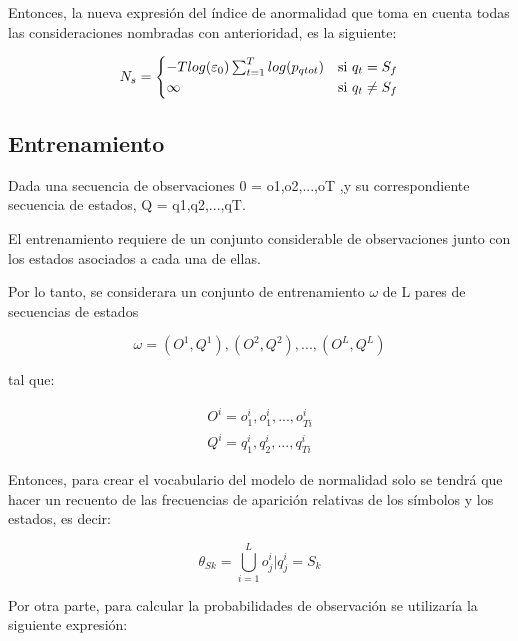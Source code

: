 Entonces, la nueva expresión del índice de anormalidad que toma en cuenta todas las consideraciones nombradas con anterioridad, es la siguiente:

\begin{equation}\label{eq:Ns}
N_{s} = 
	\begin{cases} 
      -Tlog(\varepsilon_{0})\sum_{t=1}^{T}log(p_{qtot}) & $si $  q_{t} = S_{f} \\
      \infty & $si $  q_{t} \neq S_{f} \\ 
   \end{cases}
\end{equation}

\subsection*{Entrenamiento}

Dada una secuencia de observaciones 0 = o1,o2,...,oT ,y  su correspondiente secuencia de estados, Q = q1,q2,...,qT.

El entrenamiento requiere de un conjunto considerable de observaciones  junto con los estados asociados a cada una de ellas.

Por lo tanto, se considerara un conjunto de entrenamiento $\omega$ de L pares de secuencias de estados

\begin{equation}
\omega = {(O^{1},Q^{1}),(O^{2},Q^{2}),...,(O^{L},Q^{L})}
\end{equation}

tal que:

\begin{equation}
\begin{aligned}
O^{i} = {o_{1}^{i},o_{1}^{i},...,o_{Ti}^{i}} \\
Q^{i} = {q_{1}^{i},q_{2}^{i},...,q_{Ti}^{i}}
\end{aligned}
\end{equation}

Entonces, para crear el vocabulario del modelo de normalidad solo se tendrá que hacer un recuento de las frecuencias de aparición relativas de los símbolos y los estados, es decir:

\begin{equation}
\theta_{Sk} = \bigcup\limits_{i=1}^{L} {o_{j}^{i}|q_{j}^{i} = S_{k}}
\end{equation}

Por otra parte, para calcular la probabilidades de observación se utilizaría la siguiente expresión:

